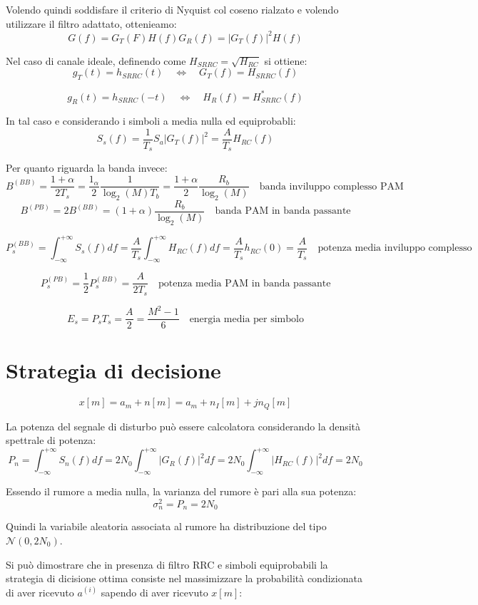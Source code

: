 Volendo quindi soddisfare il criterio di Nyquist col coseno rialzato e volendo utilizzare il filtro adattato, ottenieamo:
\[
    G(f) = G_T(F) H(f) G_R(f) = |G_T(f)|^2 H(f)
\]

Nel caso di canale ideale, definendo come $H_{SRRC} = \sqrt{H_{RC}}$ si ottiene:
\[
    g_T(t) = h_{SRRC}(t) \quad \Longleftrightarrow \quad G_T(f) = H_{SRRC}(f) 
\]

\[
    g_R(t) = h_{SRRC}(-t) \quad \Longleftrightarrow \quad H_R(f) = H_{SRRC}^*(f)
\]


In tal caso e considerando i simboli a media nulla ed equiprobabli: 
\[
    S_s(f) = \frac{1}{T_s} S_a |G_T(f)|^2 = \frac{A}{T_s} H_{RC}(f)
\]


Per quanto riguarda la banda invece:
\[
    B^{(BB)} = \frac{1+\alpha}{2T_s} = \frac{1_\alpha}{2} \frac{1}{\log_2(M) T_b} = \frac{1+\alpha}{2} \frac{R_b}{\log_2(M)} \quad \text{banda inviluppo complesso PAM}
\]
\[
    B^{(PB)} = 2 B^{(BB)} = (1+\alpha) \frac{R_b}{\log_2(M)} \quad \text{banda PAM in banda passante}
\]

\[
    P_s^{(BB)} = \int_{-\infty}^{+\infty} S_s(f) df = \frac{A}{T_s} \int_{-\infty}^{+\infty} H_{RC}(f) df = \frac{A}{T_s} h_{RC}(0) = \frac{A}{T_s} \quad \text{potenza media inviluppo complesso}
\]

\[
    P_s^{(PB)} = \frac{1}{2} P_s^{(BB)} = \frac{A}{2T_s} \quad \text{potenza media PAM in banda passante}
\]

\[
    E_s = P_s T_s = \frac{A}{2} = \frac{M^2 - 1}{6} \quad \text{energia media per simbolo}
\]


\section*{Strategia di decisione}


\[
    x[m] = a_m + n[m] = a_m + n_I[m] + jn_Q[m]
\]  

La potenza del segnale di disturbo può essere calcolatora considerando la densità spettrale di potenza:
\[
    P_n = \int_{-\infty}^{+\infty} S_n(f) df = 2N_0 \int_{-\infty}^{+\infty} |G_R(f)|^2 df = 2N_0 \int_{-\infty}^{+\infty} |H_{RC}(f)|^2 df = 2N_0
\]

Essendo il rumore a media nulla, la varianza del rumore è pari alla sua potenza:
\[
    \sigma_n^2 = P_n = 2N_0
\]

Quindi la variabile aleatoria associata al rumore ha distribuzione del tipo $\mathcal{N}(0, 2 N_0)$.

Si può dimostrare che in presenza di filtro RRC e simboli equiprobabili la strategia di dicisione ottima consiste nel massimizzare la probabilità condizionata di aver ricevuto $a^{(i)}$ sapendo di aver ricevuto $x[m]$:

